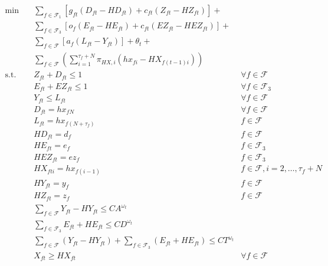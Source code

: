 \documentclass[12pt]{article}
\begin{document}
	\begin{subequations}
		\begin{align}
			\min \quad & \sum_{f \in \mathcal{F}_1} \left[ g_{ft} (D_{ft} - HD_{ft}) + c_{ft} (Z_{ft} - HZ_{ft}) \right]  + & \nonumber \\
			& \sum_{f \in \mathcal{F}_3} \left[ o_f(E_{ft} - HE_{ft}) + c_{ft}(EZ_{ft} - HEZ_{ft}) \right] + & \nonumber\\ 
			& \sum_{f \in \mathcal{F}} \left[ a_f (L_{ft} - Y_{ft})\right]  + \theta_t + &\\
			& \sum_{f \in \mathcal{F}} \left(\sum_{i = 1}^{\tau_{f} + N} \pi_{HX,i} (hx_{fi} - HX_{f(t-1)i}) \right)& \\
			\text{s.t.} \quad & Z_{ft} + D_{ft} \leq 1 & \forall f \in \mathcal{F} \label{cons:cancelORTOtlr}\\
			& E_{ft} + EZ_{ft} \leq 1 & \forall f \in \mathcal{F}_3 \label{cons:cancelTO2tlr}\\
			& Y_{ft} \leq L_{ft} & \forall f \in \mathcal{F} \label{cons:arrlandtlr}\\
			& D_{ft} = hx_{fN} & \forall f \in \mathcal{F} \label{cons:TOHisttlr1}\\
			& L_{ft} = hx_{f(N+\tau_{f})}& f \in \mathcal{F} \label{cons:landHisttlr}\\
			& HD_{ft} = d_{f} & f \in \mathcal{F} \label{cons:TOHisttlr2}\\
			& HE_{ft} = e_{f} & f \in \mathcal{F}_3 \label{cons:TO2Histtlr}\\
			& HEZ_{ft} = ez_{f} & f \in \mathcal{F}_3 \label{cons:cancelTO2Histtlr}\\
			& HX_{fti} = hx_{f(i-1)} & f \in \mathcal{F}, i = 2, \dots, \tau_{f} + N \label{cons:planHisttlr}\\
			& HY_{ft} = y_{f} & f \in \mathcal{F} \label{cons:arrHisttlr}\\
			& HZ_{ft} = z_{f} & f \in \mathcal{F} \label{cons:cancelHisttlr}\\
			& \sum_{f \in \mathcal{F}} Y_{ft} - HY_{ft} \leq CA^{\omega_t} & \label{cons:arrCaptlr}\\
			& \sum_{f \in \mathcal{F}_3} E_{ft} + HE_{ft} \leq CD^{\omega_t} &\label{cons:deptCaptlr}\\
			& \sum_{f \in \mathcal{F}} (Y_{ft} - HY_{ft}) + \sum_{f \in \mathcal{F}_3} (E_{ft} + HE_{ft}) \leq CT^{\omega_t} & \label{cons:totCaptlr}\\
			& X_{ft} \geq HX_{ft} & \forall f \in \mathcal{F} \label{cons:transXtlr}\\

\end{align}
\end{subequations}
\end{document}
